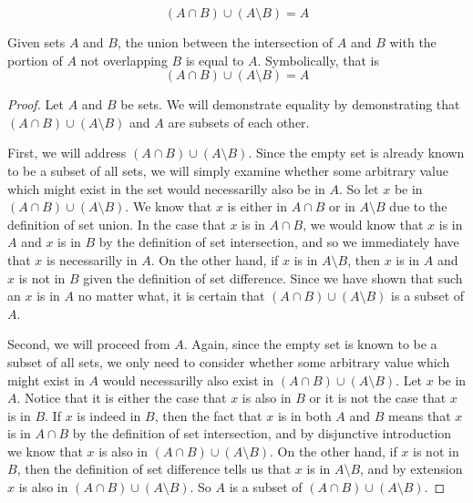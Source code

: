 \documentclass[main.tex]{subfiles}
\begin{document}
\subproblem{}\label{2i}
\[(A \cap B) \cup (A \setminus B) = A\]
\begin{thm}
	Given sets \(A\) and \(B\), the union between the intersection of \(A\)
	and \(B\) with the portion of \(A\) not overlapping \(B\) is equal to
	\(A\). Symbolically, that is
	\[(A \cap B) \cup (A \setminus B) = A\]
\end{thm}
\begin{proof}
	Let \(A\) and \(B\) be sets. We will demonstrate equality by
	demonstrating that \((A \cap B) \cup (A \setminus B)\) and \(A\) are
	subsets of each other.

	First, we will address \((A \cap B) \cup (A \setminus B)\). Since the
	empty set is already known to be a subset of all sets, we will simply
	examine whether some arbitrary value which might exist in the set would
	necessarilly also be in \(A\). So let \(x\) be in
	\((A \cap B) \cup (A \setminus B)\). We know that \(x\) is either in
	\(A \cap B\) or in \(A \setminus B\) due to the definition of set union.
	In the case that \(x\) is in \(A \cap B\), we would know that \(x\) is
	in \(A\) and \(x\) is in \(B\) by the definition of set intersection,
	and so we immediately have that \(x\) is necessarilly in \(A\). On the
	other hand, if \(x\) is in \(A \setminus B\), then \(x\) is in \(A\) and
	\(x\) is not in \(B\) given the definition of set difference. Since we
	have shown that such an \(x\) is in \(A\) no matter what, it is certain
	that \((A \cap B) \cup (A \setminus B)\) is a subset of \(A\).

	Second, we will proceed from \(A\). Again, since the empty set is known
	to be a subset of all sets, we only need to consider whether some
	arbitrary value which might exist in \(A\) would necessarilly also exist
	in \((A \cap B) \cup (A \setminus B)\). Let \(x\) be in \(A\). Notice
	that it is either the case that \(x\) is also in \(B\) or it is not the
	case that \(x\) is in \(B\). If \(x\) is indeed in \(B\), then the fact
	that \(x\) is in both \(A\) and \(B\) means that \(x\) is in
	\(A \cap B\) by the definition of set intersection, and by disjunctive
	introduction we know that \(x\) is also in
	\((A \cap B) \cup (A \setminus B)\). On the other hand, if \(x\) is not
	in \(B\), then the definition of set difference tells us that \(x\) is
	in \(A \setminus B\), and by extension \(x\) is also in
	\((A \cap B) \cup (A \setminus B)\). So \(A\) is a subset of
	\((A \cap B) \cup (A \setminus B)\).
\end{proof}
\end{document}
